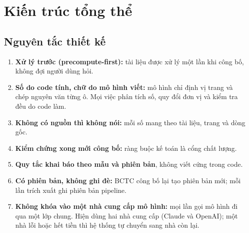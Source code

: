 \documentclass[12pt,a4paper]{report}
\begin{document}
\section{Kiến trúc tổng thể}
\subsection{Nguyên tắc thiết kế}
\begin{enumerate}
  \item \textbf{Xử lý trước (precompute-first):} tài liệu được xử lý một lần khi công bố, không đợi người dùng hỏi.
  \item \textbf{Số do code tính, chữ do mô hình viết:} mô hình chỉ định vị trang và chép nguyên văn từng ô. Mọi việc
        phân tích số, quy đổi đơn vị và kiểm tra đều do code làm.
  \item \textbf{Không có nguồn thì không nói:} mỗi số mang theo tài liệu, trang và dòng gốc.
  \item \textbf{Kiểm chứng xong mới công bố:} ràng buộc kế toán là cổng chất lượng.
  \item \textbf{Quy tắc khai báo theo mẫu và phiên bản}, không viết cứng trong code.
  \item \textbf{Có phiên bản, không ghi đè:} BCTC công bố lại tạo phiên bản mới; mỗi lần trích xuất ghi phiên bản pipeline.
  \item \textbf{Không khóa vào một nhà cung cấp mô hình:} mọi lần gọi mô hình đi qua một lớp chung. Hiện dùng hai nhà
        cung cấp (Claude và OpenAI); một nhà lỗi hoặc hết tiền thì hệ thống tự chuyển sang nhà còn lại.
\end{enumerate}
\end{document}
